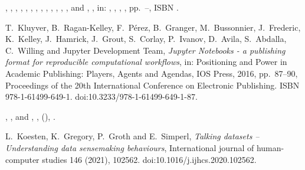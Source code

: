 \documentclass[ds,v1.1.2,openaccess]{iosart2x}%
\begin{document}
\begin{thebibliography}{}
%
\begin{bchapter}
,
,
,
,
,
,
,
,
,
,
,
,
,
 and
,
,
in: ,
,
,
,
pp.~--,
ISBN .
\end{bchapter}
%
\OrigBibText
T.~Kluyver,
B.~Ragan-Kelley,
F.~P\'{e}rez,
B.~Granger,
M.~Bussonnier,
J.~Frederic,
K.~Kelley,
J.~Hamrick,
J.~Grout,
S.~Corlay,
P.~Ivanov,
D.~Avila,
S.~Abdalla,
C.~Willing and
{Jupyter Development Team},
\textit{Jupyter Notebooks - a publishing format for reproducible computational
workflows},
in: Positioning and Power in Academic Publishing: Players, Agents and
Agendas,
IOS Press,
2016,
pp.~87--90,
Proceedings of the 20th International Conference on Electronic
Publishing.
ISBN 978-1-61499-649-1.
doi:10.3233/978-1-61499-649-1-87.
\endOrigBibText
{}
\endbibitem

%
\begin{barticle}
,
,
 and
,
,
(),
.
\end{barticle}
%
\OrigBibText
L.~Koesten,
K.~Gregory,
P.~Groth and
E.~Simperl,
\textit{Talking datasets -- Understanding data sensemaking behaviours},
International journal of human-computer studies
146
(2021),
102562.
doi:10.1016/j.ijhcs.2020.102562.
\endOrigBibText
{}
\endbibitem


\end{thebibliography}
\end{document}
